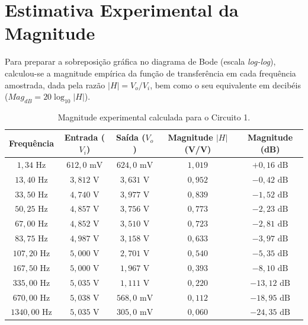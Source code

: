 \section{Estimativa Experimental da Magnitude}

Para preparar a sobreposição gráfica no diagrama de Bode (escala \textit{log-log}), calculou-se a magnitude empírica da função de transferência em cada frequência amostrada, dada pela razão $|H| = V_o / V_i$, bem como o seu equivalente em decibéis ($Mag_{dB} = 20 \log_{10}|H|$).

\begin{table}[H]
	\centering
	\caption{Magnitude experimental calculada para o Circuito 1.}
	\label{tab:mag_c1}
	\renewcommand{\arraystretch}{1.2}
	\begin{tabular}{ccccc}
		\hline
		\textbf{Frequência} & \textbf{Entrada ($V_i$)} & \textbf{Saída ($V_o$)} & \textbf{Magnitude $|H|$ (V/V)} & \textbf{Magnitude (dB)} \\ \hline
		$1,34\text{ Hz}$ & $612,0\text{ mV}$ & $624,0\text{ mV}$ & $1,019$ & $+0,16\text{ dB}$ \\
		$13,40\text{ Hz}$ & $3,812\text{ V}$ & $3,631\text{ V}$ & $0,952$ & $-0,42\text{ dB}$ \\
		$33,50\text{ Hz}$ & $4,740\text{ V}$ & $3,977\text{ V}$ & $0,839$ & $-1,52\text{ dB}$ \\
		$50,25\text{ Hz}$ & $4,857\text{ V}$ & $3,756\text{ V}$ & $0,773$ & $-2,23\text{ dB}$ \\
		$67,00\text{ Hz}$ & $4,852\text{ V}$ & $3,510\text{ V}$ & $0,723$ & $-2,81\text{ dB}$ \\
		$83,75\text{ Hz}$ & $4,987\text{ V}$ & $3,158\text{ V}$ & $0,633$ & $-3,97\text{ dB}$ \\
		$107,20\text{ Hz}$ & $5,000\text{ V}$ & $2,701\text{ V}$ & $0,540$ & $-5,35\text{ dB}$ \\
		$167,50\text{ Hz}$ & $5,000\text{ V}$ & $1,967\text{ V}$ & $0,393$ & $-8,10\text{ dB}$ \\
		$335,00\text{ Hz}$ & $5,035\text{ V}$ & $1,111\text{ V}$ & $0,220$ & $-13,12\text{ dB}$ \\
		$670,00\text{ Hz}$ & $5,038\text{ V}$ & $568,0\text{ mV}$ & $0,112$ & $-18,95\text{ dB}$ \\
		$1340,00\text{ Hz}$ & $5,035\text{ V}$ & $305,0\text{ mV}$ & $0,060$ & $-24,35\text{ dB}$ \\ \hline
	\end{tabular}
\end{table}

